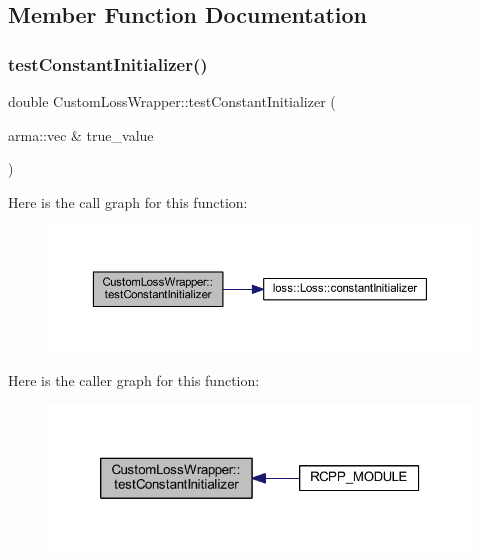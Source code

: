 \subsection{Member Function Documentation}
\mbox{\label{class_custom_loss_wrapper_a43d8b3e4c68d7662cff73a0301542815}} 
\subsubsection{\texorpdfstring{test\+Constant\+Initializer()}{testConstantInitializer()}}
{\footnotesize\ttfamily double Custom\+Loss\+Wrapper\+::test\+Constant\+Initializer (\begin{DoxyParamCaption}\item[{arma\+::vec \&}]{true\+\_\+value }\end{DoxyParamCaption})\hspace{0.3cm}{\ttfamily [inline]}}

Here is the call graph for this function\+:\nopagebreak
\begin{figure}[H]
\begin{center}
\leavevmode
\includegraphics[width=350pt]{class_custom_loss_wrapper_a43d8b3e4c68d7662cff73a0301542815_cgraph}
\end{center}
\end{figure}
Here is the caller graph for this function\+:\nopagebreak
\begin{figure}[H]
\begin{center}
\leavevmode
\includegraphics[width=320pt]{class_custom_loss_wrapper_a43d8b3e4c68d7662cff73a0301542815_icgraph}
\end{center}
\end{figure}
\mbox{\label{class_custom_loss_wrapper_a177d367857efffc9904b5e38ed4333d1}} 
